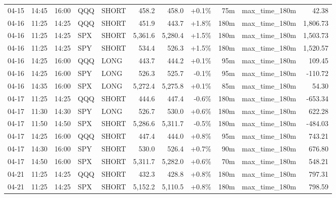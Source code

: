 \documentclass[11pt,a4paper,twoside]{article}
\begin{document}
\begin{center}
\begin{longtable}{>{\color{txtmain}}l l l l l r r r r >{\color{txtmain}}l r}
04-15 & 14:45 & 16:00 & QQQ & SHORT & 458.2 & 458.0 & \textcolor{wingreen}{+0.1\%} & 75m & max\_time\_180m & \textcolor{wingreen}{42.38} \\
04-16 & 11:25 & 14:25 & QQQ & SHORT & 451.9 & 443.7 & \textcolor{wingreen}{+1.8\%} & 180m & max\_time\_180m & \textcolor{wingreen}{1,806.73} \\
04-16 & 11:25 & 14:25 & SPX & SHORT & 5,361.6 & 5,280.4 & \textcolor{wingreen}{+1.5\%} & 180m & max\_time\_180m & \textcolor{wingreen}{1,503.73} \\
04-16 & 11:25 & 14:25 & SPY & SHORT & 534.4 & 526.3 & \textcolor{wingreen}{+1.5\%} & 180m & max\_time\_180m & \textcolor{wingreen}{1,520.57} \\
04-16 & 14:25 & 16:00 & QQQ & LONG & 443.7 & 444.2 & \textcolor{wingreen}{+0.1\%} & 95m & max\_time\_180m & \textcolor{wingreen}{109.45} \\
04-16 & 14:25 & 16:00 & SPY & LONG & 526.3 & 525.7 & \textcolor{lossred}{-0.1\%} & 95m & max\_time\_180m & \textcolor{lossred}{-110.72} \\
04-16 & 14:35 & 16:00 & SPX & LONG & 5,272.4 & 5,275.8 & \textcolor{wingreen}{+0.1\%} & 85m & max\_time\_180m & \textcolor{wingreen}{54.30} \\
04-17 & 11:25 & 14:25 & QQQ & SHORT & 444.6 & 447.4 & \textcolor{lossred}{-0.6\%} & 180m & max\_time\_180m & \textcolor{lossred}{-653.34} \\
04-17 & 11:30 & 14:30 & SPY & LONG & 526.7 & 530.0 & \textcolor{wingreen}{+0.6\%} & 180m & max\_time\_180m & \textcolor{wingreen}{622.28} \\
04-17 & 11:50 & 14:50 & SPX & SHORT & 5,286.6 & 5,311.7 & \textcolor{lossred}{-0.5\%} & 180m & max\_time\_180m & \textcolor{lossred}{-484.03} \\
04-17 & 14:25 & 16:00 & QQQ & SHORT & 447.4 & 444.0 & \textcolor{wingreen}{+0.8\%} & 95m & max\_time\_180m & \textcolor{wingreen}{743.21} \\
04-17 & 14:30 & 16:00 & SPY & SHORT & 530.0 & 526.4 & \textcolor{wingreen}{+0.7\%} & 90m & max\_time\_180m & \textcolor{wingreen}{676.80} \\
04-17 & 14:50 & 16:00 & SPX & SHORT & 5,311.7 & 5,282.0 & \textcolor{wingreen}{+0.6\%} & 70m & max\_time\_180m & \textcolor{wingreen}{548.21} \\
04-21 & 11:25 & 14:25 & QQQ & SHORT & 432.3 & 428.8 & \textcolor{wingreen}{+0.8\%} & 180m & max\_time\_180m & \textcolor{wingreen}{797.31} \\
04-21 & 11:25 & 14:25 & SPX & SHORT & 5,152.2 & 5,110.5 & \textcolor{wingreen}{+0.8\%} & 180m & max\_time\_180m & \textcolor{wingreen}{798.59} \\

\end{longtable}
\end{center}
\end{document}
